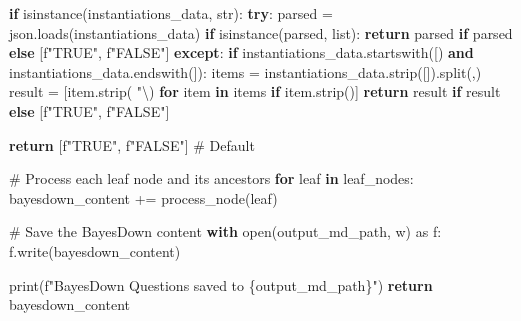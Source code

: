 \documentclass[
  11pt,
  letterpaper,
]{book}
\newenvironment{Shaded}{\begin{snugshade}}{\end{snugshade}}
\newcommand{\BuiltInTok}[1]{\textcolor[rgb]{0.00,0.23,0.31}{#1}}
\newcommand{\CharTok}[1]{\textcolor[rgb]{0.13,0.47,0.30}{#1}}
\newcommand{\CommentTok}[1]{\textcolor[rgb]{0.37,0.37,0.37}{#1}}
\newcommand{\ControlFlowTok}[1]{\textcolor[rgb]{0.00,0.23,0.31}{\textbf{#1}}}
\newcommand{\ImportTok}[1]{\textcolor[rgb]{0.00,0.46,0.62}{#1}}
\newcommand{\KeywordTok}[1]{\textcolor[rgb]{0.00,0.23,0.31}{\textbf{#1}}}
\newcommand{\NormalTok}[1]{\textcolor[rgb]{0.00,0.23,0.31}{#1}}
\newcommand{\OperatorTok}[1]{\textcolor[rgb]{0.37,0.37,0.37}{#1}}
\newcommand{\SpecialCharTok}[1]{\textcolor[rgb]{0.37,0.37,0.37}{#1}}
\newcommand{\SpecialStringTok}[1]{\textcolor[rgb]{0.13,0.47,0.30}{#1}}
\newcommand{\StringTok}[1]{\textcolor[rgb]{0.13,0.47,0.30}{#1}}
\begin{document}
\begin{Shaded}
\begin{Highlighting}[]
      \ControlFlowTok{if} \BuiltInTok{isinstance}\NormalTok{(instantiations\_data, }\BuiltInTok{str}\NormalTok{):}
          \ControlFlowTok{try}\NormalTok{:}
\NormalTok{              parsed }\OperatorTok{=}\NormalTok{ json.loads(instantiations\_data)}
              \ControlFlowTok{if} \BuiltInTok{isinstance}\NormalTok{(parsed, }\BuiltInTok{list}\NormalTok{):}
                  \ControlFlowTok{return}\NormalTok{ parsed }\ControlFlowTok{if}\NormalTok{ parsed }\ControlFlowTok{else}\NormalTok{ [}\SpecialStringTok{f"TRUE"}\NormalTok{, }\SpecialStringTok{f"FALSE"}\NormalTok{]}
          \ControlFlowTok{except}\NormalTok{:}
              \ControlFlowTok{if}\NormalTok{ instantiations\_data.startswith(}\StringTok{\textquotesingle{}[\textquotesingle{}}\NormalTok{) }\KeywordTok{and}\NormalTok{ instantiations\_data.endswith(}\StringTok{\textquotesingle{}]\textquotesingle{}}\NormalTok{):}
\NormalTok{                  items }\OperatorTok{=}\NormalTok{ instantiations\_data.strip(}\StringTok{\textquotesingle{}[]\textquotesingle{}}\NormalTok{).split(}\StringTok{\textquotesingle{},\textquotesingle{}}\NormalTok{)}
\NormalTok{                  result }\OperatorTok{=}\NormalTok{ [item.strip(}\StringTok{\textquotesingle{} "}\CharTok{\textbackslash{}\textquotesingle{}}\StringTok{\textquotesingle{}}\NormalTok{) }\ControlFlowTok{for}\NormalTok{ item }\KeywordTok{in}\NormalTok{ items }\ControlFlowTok{if}\NormalTok{ item.strip()]}
                  \ControlFlowTok{return}\NormalTok{ result }\ControlFlowTok{if}\NormalTok{ result }\ControlFlowTok{else}\NormalTok{ [}\SpecialStringTok{f"TRUE"}\NormalTok{, }\SpecialStringTok{f"FALSE"}\NormalTok{]}

      \ControlFlowTok{return}\NormalTok{ [}\SpecialStringTok{f"TRUE"}\NormalTok{, }\SpecialStringTok{f"FALSE"}\NormalTok{]  }\CommentTok{\# Default}

  \CommentTok{\# Process each leaf node and its ancestors}
  \ControlFlowTok{for}\NormalTok{ leaf }\KeywordTok{in}\NormalTok{ leaf\_nodes:}
\NormalTok{      bayesdown\_content }\OperatorTok{+=}\NormalTok{ process\_node(leaf)}

  \CommentTok{\# Save the BayesDown content}
  \ControlFlowTok{with} \BuiltInTok{open}\NormalTok{(output\_md\_path, }\StringTok{\textquotesingle{}w\textquotesingle{}}\NormalTok{) }\ImportTok{as}\NormalTok{ f:}
\NormalTok{      f.write(bayesdown\_content)}

  \BuiltInTok{print}\NormalTok{(}\SpecialStringTok{f"BayesDown Questions saved to }\SpecialCharTok{\{}\NormalTok{output\_md\_path}\SpecialCharTok{\}}\SpecialStringTok{"}\NormalTok{)}
  \ControlFlowTok{return}\NormalTok{ bayesdown\_content}
\end{Highlighting}
\end{Shaded}
\end{document}
